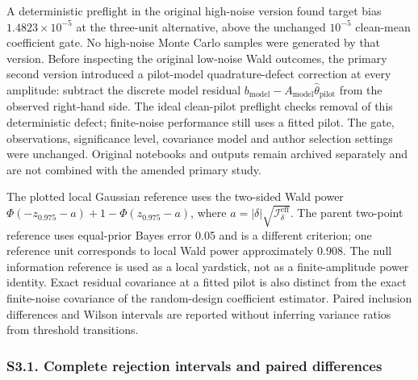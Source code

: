 \documentclass[
  american,
  11pt,
]{article}
\begin{document}
A deterministic preflight in the original high-noise version found
target bias \(1.4823\times10^{-5}\) at the three-unit alternative, above
the unchanged \(10^{-5}\) clean-mean coefficient gate. No high-noise
Monte Carlo samples were generated by that version. Before inspecting
the original low-noise Wald outcomes, the primary second version
introduced a pilot-model quadrature-defect correction at every
amplitude: subtract the discrete model residual
\(b_{\mathrm{model}}-A_{\mathrm{model}}\widehat\theta_{\mathrm{pilot}}\)
from the observed right-hand side. The ideal clean-pilot preflight
checks removal of this deterministic defect; finite-noise performance
still uses a fitted pilot. The gate, observations, significance level,
covariance model and author selection settings were unchanged. Original
notebooks and outputs remain archived separately and are not combined
with the amended primary study.

The plotted local Gaussian reference uses the two-sided Wald power
\(\Phi(-z_{0.975}-a)+1-\Phi(z_{0.975}-a)\), where
\(a=|\delta|\sqrt{\mathcal I^{\mathrm{eff}}_\delta}\). The parent
two-point reference uses equal-prior Bayes error 0.05 and is a different
criterion; one reference unit corresponds to local Wald power
approximately 0.908. The null information reference is used as a local
yardstick, not as a finite-amplitude power identity. Exact residual
covariance at a fitted pilot is also distinct from the exact
finite-noise covariance of the random-design coefficient estimator.
Paired inclusion differences and Wilson intervals are reported without
inferring variance ratios from threshold transitions.

\subsubsection{S3.1. Complete rejection intervals and paired
differences}\label{s3.1.-complete-rejection-intervals-and-paired-differences}
\end{document}
